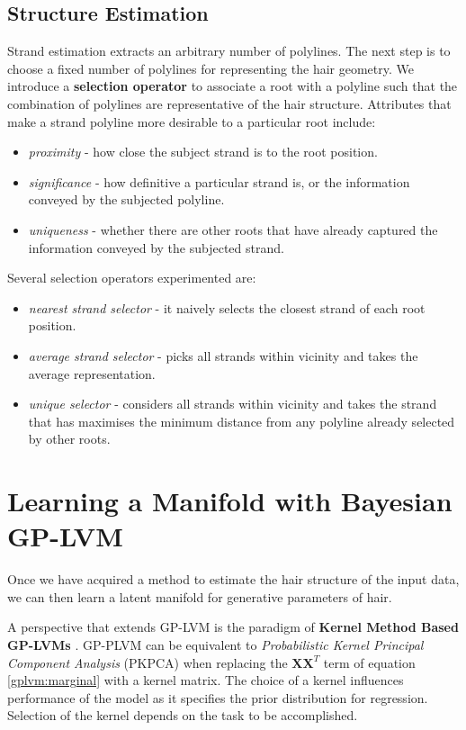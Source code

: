 \documentclass[ %
author={Dillon Keith Diep},
supervisor={Dr. Carl Henrik Ek},
degree={MEng},
title={ART-CG:},
subtitle={Assisted Real-time Content Generation of 3D Hair by Learning Manifolds},
type={Research},
year={2017} ]{dissertation}
\begin{document}
\subsection{Structure Estimation}
Strand estimation extracts an arbitrary number of polylines. The next step is to choose a fixed number of polylines for representing the hair geometry. We introduce a \textbf{selection operator} to associate a root with a polyline such that the combination of polylines are representative of the hair structure. Attributes that make a strand polyline more desirable to a particular root include:
\begin{itemize}
	\item \textit{proximity} - how close the subject strand is to the root position.
	\item \textit{significance} - how definitive a particular strand is, or the information conveyed by the subjected polyline.
	\item \textit{uniqueness} - whether there are other roots that have already captured the information conveyed by the subjected strand.
\end{itemize}
Several selection operators experimented are:
\begin{itemize}
	\item \textit{nearest strand selector} - it naively selects the closest strand of each root position. 
	\item \textit{average strand selector} - picks all strands within vicinity and takes the average representation.
	\item \textit{unique selector} - considers all strands within vicinity and takes the strand that has maximises the minimum distance from any polyline already selected by other roots.
\end{itemize}

\section{Learning a Manifold with Bayesian GP-LVM}
Once we have acquired a method to estimate the hair structure of the input data, we can then learn a latent manifold for generative parameters of hair.

A perspective that extends GP-LVM is the paradigm of \textbf{Kernel Method Based GP-LVMs} \cite{reviewgplvm}.  GP-PLVM can be equivalent to \textit{Probabilistic Kernel Principal Component Analysis} (PKPCA) when replacing the $\bm{XX}^T$ term of equation \ref{gplvm:marginal} with a kernel matrix. The choice of a kernel influences performance of the model as it specifies the prior distribution for regression. Selection of the kernel depends on the task to be accomplished.
\end{document}
